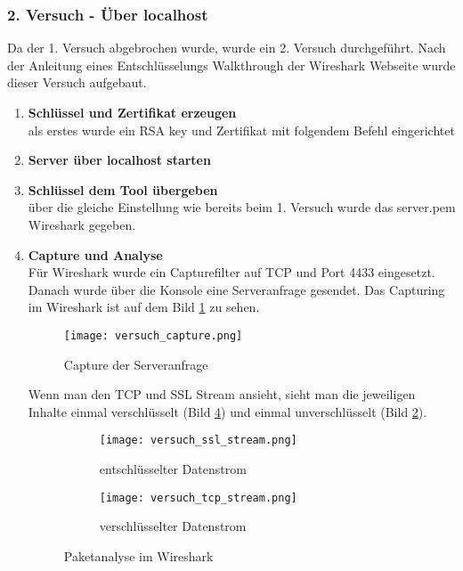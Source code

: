 	\subsubsection{2. Versuch - Über localhost}
	Da der 1. Versuch abgebrochen wurde, wurde ein 2. Versuch durchgeführt. Nach der Anleitung eines Entschlüsselungs Walkthrough der Wireshark Webseite \cite{wireshark} wurde dieser Versuch aufgebaut.
	\begin{enumerate}
		\item \textbf{Schlüssel und Zertifikat erzeugen}\\
		als erstes wurde ein RSA key und Zertifikat mit folgendem Befehl eingerichtet
		\item \textbf{Server über localhost starten}
		\item \textbf{Schlüssel dem Tool übergeben}\\
		über die gleiche Einstellung wie bereits beim 1. Versuch wurde das server.pem Wireshark gegeben.
		\item \textbf{Capture und Analyse}\\
		Für Wireshark wurde ein Capturefilter auf TCP und Port 4433 eingesetzt. Danach wurde über die Konsole eine Serveranfrage gesendet.
		Das Capturing im Wireshark ist auf dem Bild \ref{fig:versuch_capture} zu sehen.
		\begin{figure}[H]
			\centering
			\texttt{[image: versuch\_capture.png]}
			\caption{Capture der Serveranfrage}
			\label{fig:versuch_capture}
		\end{figure}				
		Wenn man den TCP und SSL Stream ansieht, sieht man die jeweiligen Inhalte einmal verschlüsselt (Bild \ref{fig:tcp_stream}) und einmal unverschlüsselt (Bild \ref{fig:ssl_stream}).
		\begin{figure}[H]
			\centering
			\begin{subfigure}{.4\textwidth}
				\centering
				\texttt{[image: versuch\_ssl\_stream.png]}
				\caption{entschlüsselter Datenstrom}
				\label{fig:ssl_stream}
			\end{subfigure}
			\begin{subfigure}{.4\textwidth}
			 	\centering
				\texttt{[image: versuch\_tcp\_stream.png]}
				\caption{verschlüsselter Datenstrom}
				\label{fig:tcp_stream}
			\end{subfigure}
			\caption{Paketanalyse im Wireshark}
		\end{figure}
	\end{enumerate}
	

